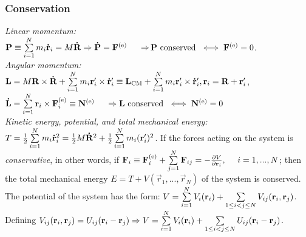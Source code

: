 \subsubsection*{Conservation}
\emph{Linear momentum:}\\
$\mathbf{P}\equiv \sum\limits_{i=1}^{N}m_{i}\accentset{\mbox{\bfseries .}}{\mathbf{r}}_{i}=M\accentset{\mbox{\bfseries .}}{\mathbf{R}}\Rightarrow \accentset{\mbox{\bfseries .}}{\mathbf{P}}=\mathbf{F}^{\text{(e)}}\ \ \ \ \Rightarrow $\hfill $\mathbf{P}\text{ conserved }\iff \mathbf{F}^{\text{(e)}}=0$.\\
\emph{Angular momentum:}\\
$\vec{L}=M\vec{R}\times\dot{\vec{R}}+\sum\limits_{i=1}^{N}m\i\vec{r}'\i\times\dot{\vec{r}}\i'\equiv\vec{L}_{\text{CM}}+\sum\limits_{i=1}^{N}m\i\vec{r}'\i\times\dot{\vec{r}}\i',\hfill \vec{r}\i=\vec{R}+\vec{r}\i'$,\\
$ \dot{\vec{L}}=\sum\limits_{i=1}^{N}\vec{r}\i\times\vec{F}\i\ext\equiv\vec{N}\ext\ \ \ \ \then \hfill \vec{L}\text{ conserved }\iff \vec{N}\ext=0$\\
\emph{Kinetic energy, potential, and total mechanical energy:}\\
$T=\frac{1}{2}\sum\limits_{i=1}^{N}m_{i}\accentset{\mbox{\bfseries .}}{\mathbf{r}}_{i}^{2}=\frac{1}{2}M\accentset{\mbox{\bfseries .}}{\mathbf{R}}^{2}+\frac{1}{2}\sum\limits_{i=1}^{N}m_{i}(\mathbf{r}'_{i})^{2}$. If the forces acting on the system is \emph{conservative}, in other words, if $\vec{F}\i\equiv\vec{F}\i\ext+\sum\limits_{j=1}^{N}\vec{F}_{ij}=-\partials{V}{\vec{r}\i},\ \ \ \ i=1,...,N$; then the total mechanical energy $E=T+V(\vec{r}_{1},...,\vec{r}_{N})$ of the system is conserved.\\
The potential of the system has the form: $V=\sum\limits_{i=1}^{N}V_{i}(\mathbf{r}_{i})+\sum\limits_{1\leq i<j\leq N}V_{ij}(\mathbf{r}_{i},\mathbf{r}_{j})$.\\
Defining $V\ij(\vec{r}_{i},\vec{r}_{j})=U\ij(\vec{r}\i-\vec{r}\j)\then\hfill V=\sum\limits_{i=1}^{N}V\i(\vec{r}\i)+\sum\limits_{1\leq i<j\leq N}U\ij(\vec{r}\i-\vec{r}\j)$.





























